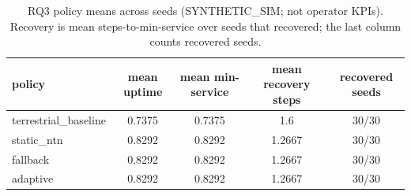\begin{table}[h]\centering
\caption{RQ3 policy means across seeds (SYNTHETIC\_SIM; not operator KPIs). Recovery is mean steps-to-min-service over seeds that recovered; the last column counts recovered seeds.}
\begin{tabular}{lcccc}\toprule
policy & mean uptime & mean min-service & mean recovery steps & recovered seeds \\\midrule
terrestrial\_baseline & 0.7375 & 0.7375 & 1.6 & 30/30 \\
static\_ntn & 0.8292 & 0.8292 & 1.2667 & 30/30 \\
fallback & 0.8292 & 0.8292 & 1.2667 & 30/30 \\
adaptive & 0.8292 & 0.8292 & 1.2667 & 30/30 \\
\bottomrule\end{tabular}\end{table}
